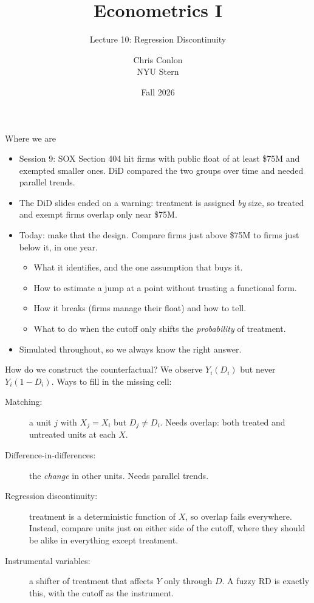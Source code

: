 \documentclass[aspectratio=169,11pt]{beamer}
\title[L10 - RDD]{ Econometrics I}
\subtitle{Lecture 10: Regression Discontinuity}
\author{Chris Conlon \\NYU Stern}
\date{Fall 2026}
\begin{document}
\frame{\titlepage}


\begin{frame}{Where we are}
\begin{itemize}
	\item Session 9: SOX Section 404 hit firms with public float of at least \$75M and exempted smaller ones.
	DiD compared the two groups over time and needed parallel trends.
	\medskip
	\item The DiD slides ended on a warning: treatment is assigned \emph{by} size, so treated and exempt firms
	overlap only near \$75M.
	\medskip
	\item Today: make that the design. Compare firms just above \$75M to firms just below it, in one year.
	\begin{itemize}
		\item What it identifies, and the one assumption that buys it.
		\item How to estimate a jump at a point without trusting a functional form.
		\item How it breaks (firms manage their float) and how to tell.
		\item What to do when the cutoff only shifts the \emph{probability} of treatment.
	\end{itemize}
	\medskip
	\item Simulated throughout, so we always know the right answer.
\end{itemize}
\end{frame}


\begin{frame}{How do we construct the counterfactual?}
We observe $Y_i(D_i)$ but never $Y_i(1-D_i)$. Ways to fill in the missing cell:
\begin{description}
	\item [Matching:] a unit $j$ with $X_j = X_i$ but $D_j \ne D_i$. Needs overlap: both treated and untreated
	units at each $X$.
	\item [Difference-in-differences:] the \emph{change} in other units. Needs parallel trends.
	\item [\alert{Regression discontinuity:}] treatment is a deterministic function of $X$, so overlap fails
	everywhere. Instead, compare units just on either side of the cutoff, where they should be alike in
	everything except treatment.
	\item [Instrumental variables:] a shifter of treatment that affects $Y$ only through $D$. A fuzzy RD is
	exactly this, with the cutoff as the instrument.
\end{description}
\end{frame}
\end{document}
